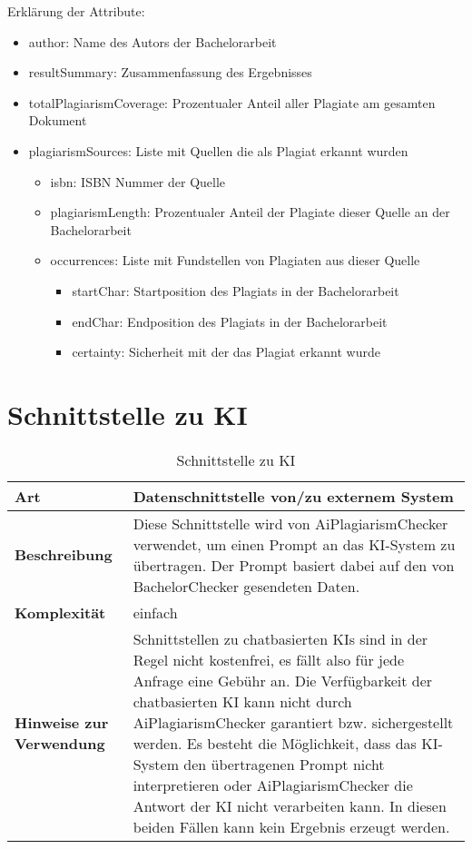 Erklärung der Attribute:
\begin{itemize}
    \item author: Name des Autors der Bachelorarbeit
    \item resultSummary: Zusammenfassung des Ergebnisses
    \item totalPlagiarismCoverage: Prozentualer Anteil aller Plagiate am gesamten Dokument
    \item plagiarismSources: Liste mit Quellen die als Plagiat erkannt wurden
    \begin{itemize}
        \item isbn: ISBN Nummer der Quelle
        \item plagiarismLength: Prozentualer Anteil der Plagiate dieser Quelle an der Bachelorarbeit
        \item occurrences: Liste mit Fundstellen von Plagiaten aus dieser Quelle
        \begin{itemize}
            \item startChar: Startposition des Plagiats in der Bachelorarbeit
            \item endChar: Endposition des Plagiats in der Bachelorarbeit
            \item certainty: Sicherheit mit der das Plagiat erkannt wurde
        \end{itemize}
    \end{itemize}
\end{itemize}


\section{Schnittstelle zu KI}\label{sec:schnittstelle-ki}

\begin{table}[H]
    \label{tab:schnittstelle-ki}
    \begin{tabularx}{\textwidth}{|l|X|}
        \hline
        \textbf{Art}         & Datenschnittstelle von/zu externem System \\
        \hline
        \textbf{Beschreibung} & Diese Schnittstelle wird von AiPlagiarismChecker verwendet, um einen Prompt an das KI-System zu übertragen.
        Der Prompt basiert dabei auf den von BachelorChecker gesendeten Daten. \\
        \hline
        \textbf{Komplexität} & einfach                                   \\
        \hline
        \textbf{Hinweise zur Verwendung} & Schnittstellen zu chatbasierten KIs sind in der Regel nicht kostenfrei, es fällt also für jede Anfrage eine Gebühr an.
        Die Verfügbarkeit der chatbasierten KI kann nicht durch AiPlagiarismChecker garantiert bzw. sichergestellt werden.
        Es besteht die Möglichkeit, dass das KI-System den übertragenen Prompt nicht interpretieren oder AiPlagiarismChecker die Antwort der KI nicht verarbeiten kann.
        In diesen beiden Fällen kann kein Ergebnis erzeugt werden. \\
        \hline
    \end{tabularx}
    \caption {Schnittstelle zu KI}
\end{table}